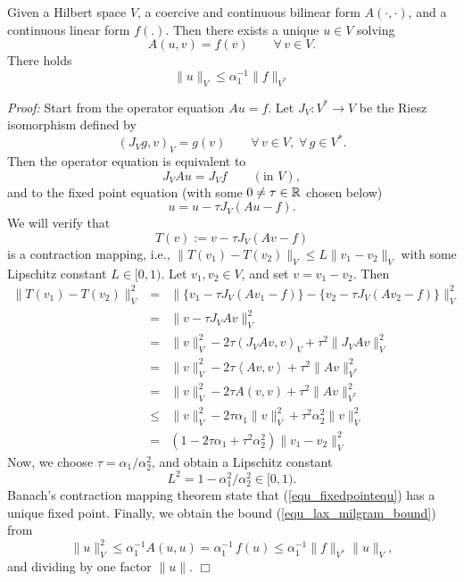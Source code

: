 \begin{theorem} Given a Hilbert space $V$, a coercive and continuous bilinear form $A(\cdot,\cdot)$, and a continuous linear form $f(.)$. Then there exists a unique $u \in V$ solving
$$
A(u,v) = f(v) \qquad \forall \, v \in V.
$$
There holds 
\begin{equation} \label{equ_lax_milgram_bound}
\| u \|_V \leq \alpha_1^{-1} \| f \|_{V^\ast}
\end{equation}
\end{theorem}
{\em Proof:} Start from the operator equation $A u = f$. Let $J_V : V^\ast \rightarrow V$ be the Riesz isomorphism defined by
$$
(J_V g, v)_V = g(v) \qquad \forall \, v \in V, \;  \forall \, g \in V^\ast.
$$
Then the operator equation is equivalent to
$$
J_V A u = J_V f \qquad (\mbox{in } V),
$$
and to the fixed point equation (with some $0 \neq \tau \in {\mathbb R}$ chosen below)
\begin{equation} \label{equ_fixedpointequ}
u = u - \tau J_V (A u - f).
\end{equation}
We will verify that
$$
T (v) := v - \tau J_V (A v - f)
$$
is a contraction mapping, i.e., $\| T (v_1) - T (v_2) \|_V \leq L \| v_1 - v_2 \|_V$ 
with some Lipschitz constant $L \in [0,1)$.
Let $v_1, v_2 \in V$, and set $v = v_1 - v_2$. Then
\begin{eqnarray*}
\| T (v_1) - T (v_2) \|_V^2 
& = & \| \{ v_1 - \tau J_V (A v_1 - f) \} - \{ v_2 - \tau J_V (A v_2 -f) \} \|_V^2 \\
& = & \| v - \tau J_V A v \|_V^2 \\
& = & \| v \|_V^2 - 2 \tau (J_V A v, v)_V + \tau^2 \| J_V A v \|_V^2 \\
& = & \| v \|_V^2 - 2 \tau \left< A v , v \right> + \tau^2 \| A v \|_{V^\ast}^2 \\
& = & \| v \|_V^2 - 2 \tau A(v,v) + \tau^2 \| A v \|_{V^\ast}^2 \\
& \leq & \| v \|_V^2 - 2 \tau \alpha_1 \| v \|_V^2 + \tau^2 \alpha_2^2 \| v \|_V^2 \\
& = & (1 - 2 \tau \alpha_1 + \tau^2 \alpha_2^2) \| v_1 - v_2 \|_V^2
\end{eqnarray*}
Now, we choose $\tau = \alpha_1 / \alpha_2^2$, and obtain a Lipschitz constant
$$
L^2 = 1 - \alpha_1^2 / \alpha_2^2 \in [0,1).
$$
Banach's contraction mapping theorem state that (\ref{equ_fixedpointequ}) 
has a unique fixed point. Finally, we obtain the bound (\ref{equ_lax_milgram_bound}) from
$$
\| u \|_V^2 \leq \alpha_1^{-1} A(u,u) = \alpha_1^{-1} \, f(u) \leq \alpha_1^{-1} \| f\|_{V^\ast} \| u \|_V,
$$
and dividing by one factor $\|u\|$.
\hfill $\Box$

